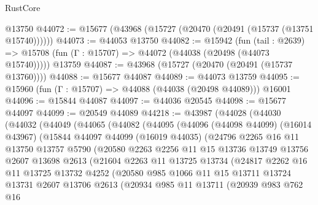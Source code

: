 \begin{lexlean}{RustCore}
\begin{coremodule}
    @13750
@44072 := @15677 (@43968 (@15727 (@20470 (@20491 (@15737 (@13751 @15740))))))
@44073 := @44053 @13750
@44082 := @15942
    (fun (tail : @2639) => @15708 (fun (Γ : @15707) => @44072 (@44038 (@20498 (@44073 @15740)))))
    @13759
@44087 := @43968 (@15727 (@20470 (@20491 (@15737 @13760))))
@44088 := @15677 @44087
@44089 := @44073 @13759
@44095 := @15960 (fun (Γ : @15707) => @44088 (@44038 (@20498 @44089))) @16001
@44096 := @15844 @44087
@44097 := @44036 @20545
@44098 := @15677 @44097
@44099 := @20549 @44089
@44218 := @43987
    (@44028
      (@44030
        (@44032
          (@44049
            (@44065
              (@44082
                (@44095
                  (@44096
                    (@44098 @44099)
                    (@16014 @43967)
                    (@15844
                      @44097
                      @44099
                      (@16019 @44035)
                      (@24796
                        @2265
                        @16
                        @11
                        @13750
                        @13757
                        @5790
                        (@20580
                          @2263
                          @2256
                          @11
                          @15
                          @13736
                          @13749
                          @13756
                          @2607
                          @13698
                          @2613
                          (@21604
                            @2263
                            @11
                            @13725
                            @13734
                            (@24817
                              @2262
                              @16
                              @11
                              @13725
                              @13732
                              @4252
                              (@20580
                                @985
                                @1066
                                @11
                                @15
                                @13711
                                @13724
                                @13731
                                @2607
                                @13706
                                @2613
                                (@20934
                                  @985
                                  @11
                                  @13711
                                  (@20939
                                    @983
                                    @762
                                    @16

\end{coremodule}
\end{lexlean}
